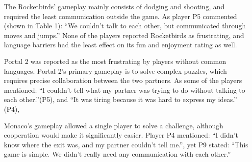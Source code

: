 The Rocketbirds' gameplay mainly consists of dodging and shooting, and required the least communication outside the game. As player P5 commented (shown in Table 1): ``We couldn't talk to each other, but communicated through moves and jumps.'' 
None of the players reported Rocketbirds as frustrating, and language barriers had the least effect on its fun and enjoyment rating as well.


Portal 2 was reported as the most frustrating by players without common languages. Portal 2's primary gameplay is to solve complex puzzles, which requires precise collaboration between the two partners. As some of the players mentioned: ``I couldn't tell what my partner was trying to do without talking to each other.''(P5), and ``It was tiring because it was hard to express my ideas.'' (P4),



Monaco's gameplay allowed a single player to solve a challenge, although cooperation would make it significantly easier. Player P4 mentioned: ``I didn't know where the exit was, and my partner couldn't tell me.'', yet P9 stated:  ``This game is simple. We didn’t really need any communication with each other.''

